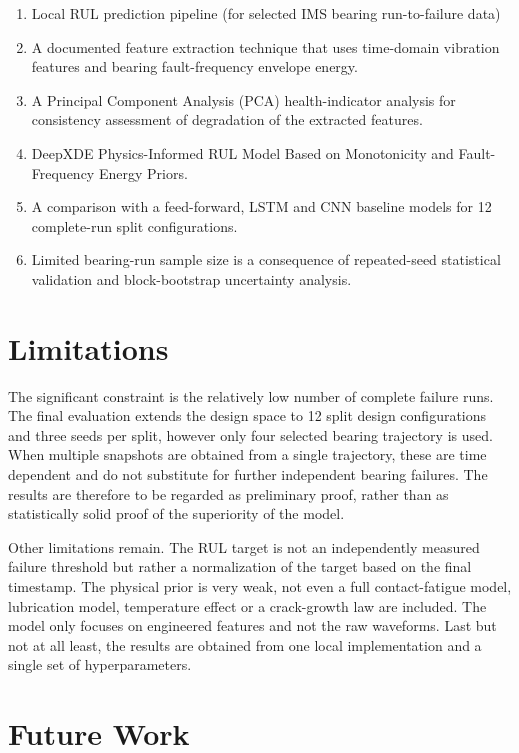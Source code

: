 \begin{enumerate}[label=\arabic*.]
	\item Local RUL prediction pipeline (for selected IMS bearing run-to-failure data)
	\item A documented feature extraction technique that uses time-domain vibration features and bearing fault-frequency envelope energy.
	\item A Principal Component Analysis (PCA) health-indicator analysis for consistency assessment of degradation of the extracted features.
	\item DeepXDE Physics-Informed RUL Model Based on Monotonicity and Fault-Frequency Energy Priors.
	\item A comparison with a feed-forward, LSTM and CNN baseline models for 12 complete-run split configurations.
	\item Limited bearing-run sample size is a consequence of repeated-seed statistical validation and block-bootstrap uncertainty analysis.
\end{enumerate}

\section{Limitations}

The significant constraint is the relatively low number of complete failure runs. The final evaluation extends the design space to 12 split design configurations and three seeds per split, however only four selected bearing trajectory is used. When multiple snapshots are obtained from a single trajectory, these are time dependent and do not substitute for further independent bearing failures. The results are therefore to be regarded as preliminary proof, rather than as statistically solid proof of the superiority of the model.

Other limitations remain. The RUL target is not an independently measured failure threshold but rather a normalization of the target based on the final timestamp. The physical prior is very weak, not even a full contact-fatigue model, lubrication model, temperature effect or a crack-growth law are included. The model only focuses on engineered features and not the raw waveforms. Last but not at all least, the results are obtained from one local implementation and a single set of hyperparameters.

\section{Future Work}

